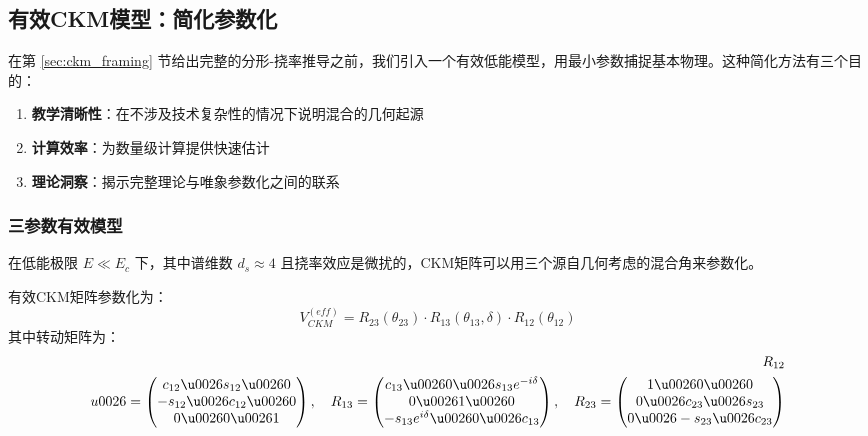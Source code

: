 \subsection{有效CKM模型：简化参数化}
\label{sec:ckm_effective}

在第 \ref{sec:ckm_framing} 节给出完整的分形-挠率推导之前，我们引入一个有效低能模型，用最小参数捕捉基本物理。这种简化方法有三个目的：

\begin{enumerate}
    \item \textbf{教学清晰性}：在不涉及技术复杂性的情况下说明混合的几何起源
    \item \textbf{计算效率}：为数量级计算提供快速估计
    \item \textbf{理论洞察}：揭示完整理论与唯象参数化之间的联系
\end{enumerate}

\subsubsection{三参数有效模型}

在低能极限 $E \ll E_c$ 下，其中谱维数 $d_s \approx 4$ 且挠率效应是微扰的，CKM矩阵可以用三个源自几何考虑的混合角来参数化。

\begin{model}[有效几何CKM]
有效CKM矩阵参数化为：
\begin{equation}
    V_{CKM}^{(eff)} = R_{23}(\theta_{23}) \cdot R_{13}(\theta_{13}, \delta) \cdot R_{12}(\theta_{12})
\end{equation}
其中转动矩阵为：
\begin{align}
    R_{12} \\u0026= \begin{pmatrix} c_{12} \u0026 s_{12} \u0026 0 \\ -s_{12} \u0026 c_{12} \u0026 0 \\ 0 \u0026 0 \u0026 1 \end{pmatrix}, \quad
    R_{13} = \begin{pmatrix} c_{13} \u0026 0 \u0026 s_{13}e^{-i\delta} \\ 0 \u0026 1 \u0026 0 \\ -s_{13}e^{i\delta} \u0026 0 \u0026 c_{13} \end{pmatrix}, \quad
    R_{23} = \begin{pmatrix} 1 \u0026 0 \u0026 0 \\ 0 \u0026 c_{23} \u0026 s_{23} \\ 0 \u0026 -s_{23} \u0026 c_{23} \end{pmatrix}
\end{align}
\end{model}

